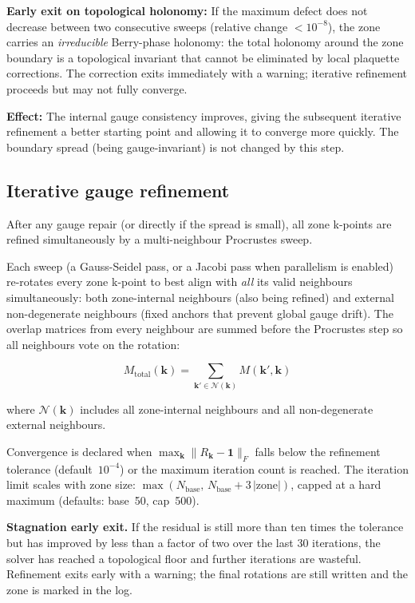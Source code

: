 \documentclass[a4paper,12pt]{report}
\begin{document}
\textbf{Early exit on topological holonomy:} If the maximum defect does not
decrease between two consecutive sweeps (relative change $< 10^{-8}$), the
zone carries an \emph{irreducible} Berry-phase holonomy: the total holonomy
around the zone boundary is a topological invariant that cannot be eliminated
by local plaquette corrections.
The correction exits immediately with a warning; iterative refinement proceeds
but may not fully converge.

\textbf{Effect:} The internal gauge consistency improves, giving the
subsequent iterative refinement a better starting point and allowing it to
converge more quickly.
The boundary spread (being gauge-invariant) is not changed by this step.


\subsection*{Iterative gauge refinement}

After any gauge repair (or directly if the spread is small), all zone
k-points are refined simultaneously by a multi-neighbour Procrustes sweep.

Each sweep (a Gauss-Seidel pass, or a Jacobi pass when parallelism is
enabled) re-rotates every zone k-point to best align with \emph{all} its
valid neighbours simultaneously: both zone-internal neighbours (also being
refined) and external non-degenerate neighbours (fixed anchors that prevent
global gauge drift).
The overlap matrices from every neighbour are summed before the Procrustes
step so all neighbours vote on the rotation:

\begin{equation}
  M_{\text{total}}(\pmb{k}) = \sum_{\pmb{k}' \in \mathcal{N}(\pmb{k})}
  M(\pmb{k}', \pmb{k})
\end{equation}

where $\mathcal{N}(\pmb{k})$ includes all zone-internal neighbours and all
non-degenerate external neighbours.

Convergence is declared when $\max_{\pmb{k}} \|R_{\pmb{k}} - \mathbf{1}\|_F$
falls below the refinement tolerance (default~$10^{-4}$) or the maximum
iteration count is reached.
The iteration limit scales with zone size:
$\max(N_{\mathrm{base}},\, N_{\mathrm{base}} + 3\,|\text{zone}|)$,
capped at a hard maximum (defaults: base~50, cap~500).

\textbf{Stagnation early exit.}
If the residual is still more than ten times the tolerance but has improved by
less than a factor of two over the last 30 iterations, the solver has reached a
topological floor and further iterations are wasteful.
Refinement exits early with a warning; the final rotations are still written
and the zone is marked in the log.
\end{document}
